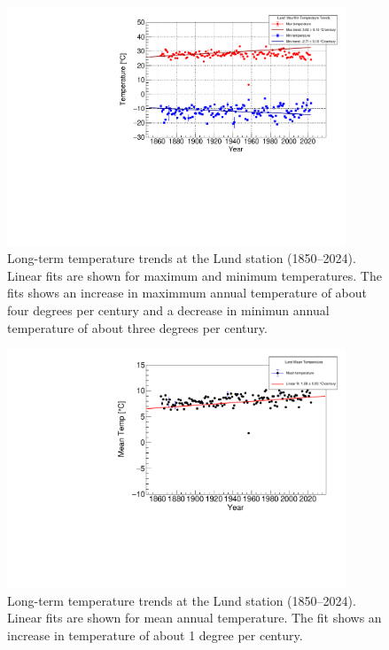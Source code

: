 \begin{figure}[H]
    \centering
        \centering
        \includegraphics[width=0.9\textwidth]{plots/max_min_temps/Lund_max_min_trends.pdf}
        \caption{Long-term temperature trends at the Lund station (1850--2024). 
    Linear fits are shown for maximum and minimum temperatures. The fits shows an increase in maximmum annual temperature of about four degrees per century and a decrease in minimun annual temperature of about three degrees per century.}
        \label{fig:lund_maxmin}
\end{figure}
\begin{figure}[H]
        \centering
        \includegraphics[width=0.9\textwidth]{plots/mean_temps/Lund_mean_trend.pdf}
        \caption{Long-term temperature trends at the Lund station (1850--2024). 
    Linear fits are shown for mean annual temperature. The fit shows an increase in temperature of about 1 degree per century.}
        \label{fig:lund_mean}
\end{figure}


